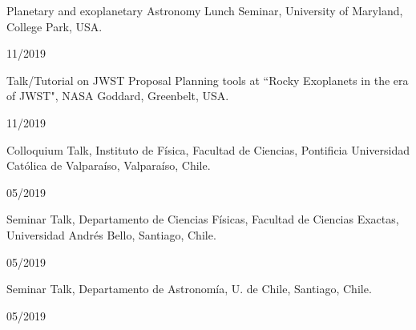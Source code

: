 \documentclass[12pt, a4paper]{article} %
\begin{document}
\begin{minipage}[t]{0.7\textwidth}
\begin{flushleft}%
  \setlength{\leftskip}{0.2cm}%
Planetary and exoplanetary Astronomy Lunch Seminar, University of Maryland, College Park, USA.
\end{flushleft}
\end{minipage}
\begin{minipage}[t]{0.3\textwidth}
\hfill 11/2019
\end{minipage}
\vspace{0.2cm}

\begin{minipage}[t]{0.7\textwidth}
\begin{flushleft}%
  \setlength{\leftskip}{0.2cm}%
Talk/Tutorial on JWST Proposal Planning tools at ``Rocky Exoplanets in the era of JWST", NASA Goddard, Greenbelt, USA.
\end{flushleft}
\end{minipage}
\begin{minipage}[t]{0.3\textwidth}
\hfill 11/2019
\end{minipage}
\vspace{0.2cm}

\begin{minipage}[t]{0.7\textwidth}
\begin{flushleft}%
  \setlength{\leftskip}{0.2cm}%
Colloquium Talk, Instituto de F\'isica, Facultad de Ciencias, Pontificia Universidad Cat\'olica de Valpara\'iso, Valpara\'iso, Chile.
\end{flushleft}
\end{minipage}
\begin{minipage}[t]{0.3\textwidth}
\hfill 05/2019
\end{minipage}
\vspace{0.2cm}

\begin{minipage}[t]{0.7\textwidth}
\begin{flushleft}%
  \setlength{\leftskip}{0.2cm}%
Seminar Talk, Departamento de Ciencias F\'isicas, Facultad de Ciencias
Exactas, Universidad Andr\'es Bello, Santiago, Chile.
\end{flushleft}
\end{minipage}
\begin{minipage}[t]{0.3\textwidth}
\hfill 05/2019
\end{minipage}
\vspace{0.2cm}


\begin{minipage}[t]{0.7\textwidth}
\begin{flushleft}%
  \setlength{\leftskip}{0.2cm}%
Seminar Talk, Departamento de Astronom\'ia, U. de Chile, Santiago, Chile.
\end{flushleft}
\end{minipage}
\begin{minipage}[t]{0.3\textwidth}
\hfill 05/2019
\end{minipage}
\vspace{0.2cm}
\end{document}
